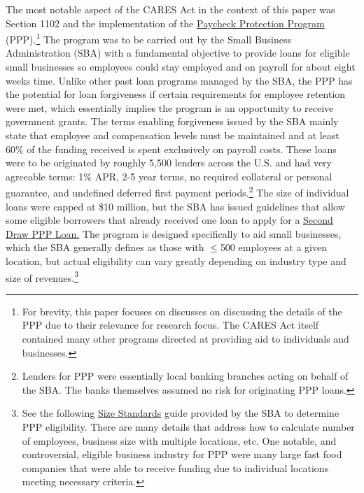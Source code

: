 \documentclass[11pt]{article} %
\begin{document}
 The most notable aspect of the CARES Act in the context of this paper was Section 1102 and the implementation of the \href{https://www.sba.gov/funding-programs/loans/coronavirus-relief-options/paycheck-protection-program}{Paycheck Protection Program} (PPP).\footnote{For brevity, this paper focuses on discusses on discussing the details of the PPP due to their relevance for research focus. The CARES Act itself contained many other programs directed at providing aid to individuals and businesses.} The program was to be carried out by the Small Business Administration (SBA) with a fundamental objective to provide loans for eligible small businesses so employees could stay employed and on payroll for about eight weeks time. Unlike other past loan programs managed by the SBA, the PPP has the potential for loan forgiveness if certain requirements for employee retention were met, which essentially implies the program is an opportunity to receive government grants. The terms enabling forgiveness issued by the SBA mainly state that employee and compensation levels must be maintained and at least 60\% of the funding received is spent exclusively on payroll costs. These loans were to be originated by roughly 5,500 lenders across the U.S. and had very agreeable terms: 1\% APR, 2-5 year terms, no required collateral or personal guarantee, and undefined deferred first payment periods.\footnote{Lenders for PPP were essentially local banking branches acting on behalf of the SBA. The banks themselves assumed no risk for originating PPP loans.} The size of individual loans were capped at \$10 million, but the SBA has issued guidelines that allow some eligible borrowers that already received one loan to apply for a \href{https://www.sba.gov/funding-programs/loans/coronavirus-relief-options/paycheck-protection-program/second-draw-ppp-loans}{Second Draw PPP Loan.} The program is designed specifically to aid small businesses, which the SBA generally defines as those with $\leq$500 employees at a given location, but actual eligibility can vary greatly depending on industry type and size of revenues.\footnote{See the following \href{https://www.sba.gov/managing-business/running-business/size-standards}{Size Standards} guide provided by the SBA to determine PPP eligibility. There are many details that address how to calculate number of employees, business size with multiple locations, etc. One notable, and controversial, eligible business industry for PPP were many large fast food companies that were able to receive funding due to individual locations meeting necessary criteria.}    
 
\end{document}
